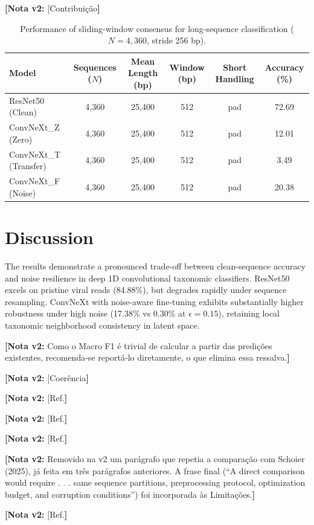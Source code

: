 \documentclass[11pt,a4paper]{article}
\newcommand{\notavdois}[1]{\par\vspace{0.4em}\noindent\colorbox{yellow!25}{\begin{minipage}{0.96\linewidth}\footnotesize\textbf{[Nota v2:} #1\textbf{]}\end{minipage}}\par\vspace{0.4em}}
\begin{document}
{{{\notavdois{[Contribuição}


\begin{table}[h!]
\centering
\small
\caption{Performance of sliding-window consensus for long-sequence classification ($N=4,360$, stride 256 bp).}
\begin{tabular}{lccccc}
\toprule
\textbf{Model} & \textbf{Sequences ($N$)} & \textbf{Mean Length (bp)} & \textbf{Window (bp)} & \textbf{Short Handling} & \textbf{Accuracy (\%)} \\
\midrule
ResNet50 (Clean) & 4,360 & 25,400 & 512 & pad & 72.69 \\
ConvNeXt\_Z (Zero) & 4,360 & 25,400 & 512 & pad & 12.01 \\
ConvNeXt\_T (Transfer) & 4,360 & 25,400 & 512 & pad & 3.49 \\
ConvNeXt\_F (Noise) & 4,360 & 25,400 & 512 & pad & 20.38 \\
\bottomrule
\end{tabular}
\end{table}

\section{Discussion}
The results demonstrate a pronounced trade-off between clean-sequence accuracy and noise resilience in deep 1D convolutional taxonomic classifiers. ResNet50 excels on pristine viral reads (84.88\%), but degrades rapidly under sequence resampling. ConvNeXt with noise-aware fine-tuning exhibits substantially higher robustness under high noise (17.38\% vs 0.30\% at $\epsilon=0.15$), retaining local taxonomic neighborhood consistency in latent space.

\notavdois{Como o Macro F1 é trivial de calcular a partir das predições existentes, recomenda-se reportá-lo diretamente, o que elimina essa ressalva.}


\notavdois{[Coerência}


\notavdois{[Ref.}


\notavdois{[Ref.}


\notavdois{[Ref.}


\notavdois{Removido na v2 um parágrafo que repetia a comparação com Schoier (2025), já feita em três parágrafos anteriores. A frase final (“A direct comparison would require . . . same sequence partitions, preprocessing protocol, optimization budget, and corruption conditions”) foi incorporada às Limitações.}


\notavdois{[Ref.}


}}}
\end{document}
